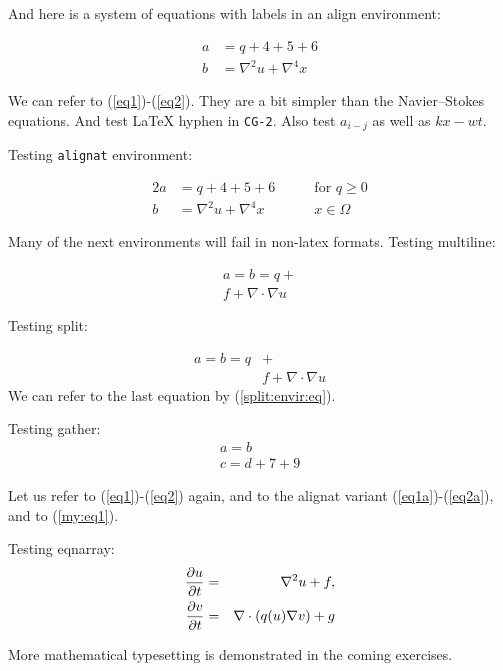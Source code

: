 \documentclass[%
oneside,                 %
final,                   %
10pt]{article}
\theoremstyle{definition}
\begin{document}
\begin{enumerate}
And here is a system of equations with labels in an align environment:

\begin{align}
a &= q + 4 + 5+ 6 \label{eq1} \\ 
b &= \nabla^2 u + \nabla^4 x \label{eq2}
\end{align}

We can refer to (\ref{eq1})-(\ref{eq2}). They are a bit simpler than
the Navier--Stokes equations. And test {\LaTeX} hyphen in \texttt{CG-2}.
Also test $a_{i-j}$ as well as $kx-wt$.

Testing \texttt{alignat} environment:

\begin{alignat}{2}
a &= q + 4 + 5+ 6\qquad & \mbox{for } q\geq 0 \label{eq1a} \\ 
b &= \nabla^2 u + \nabla^4 x & x\in\Omega \label{eq2a}
\end{alignat}

Many of the next environments will fail in non-latex formats.
Testing multiline:

\begin{multline}
a = b = q + \\ 
  f + \nabla\cdot\nabla u
\label{multiline:eq1}
\end{multline}

Testing split:

\begin{equation}
\label{split:envir:eq}
\begin{split}
a = b = q &+ \\ 
  & f + \nabla\cdot\nabla u
\end{split}
\end{equation}
We can refer to the last equation by (\ref{split:envir:eq}).

Testing gather:
\begin{gather}
a = b \\ 
c = d + 7 + 9
\end{gather}

Let us refer to (\ref{eq1})-(\ref{eq2}) again, and to the
alignat variant (\ref{eq1a})-(\ref{eq2a}), and to (\ref{my:eq1}).

Testing eqnarray:
\begin{eqnarray}
{\partial u\over\partial t} &=& \nabla^2 u + f, \label{myeq1}\\ 
{\partial v\over\partial t} &=& \nabla\cdot(q(u)\nabla v) + g \label{myeq2}
\end{eqnarray}

More mathematical typesetting is demonstrated in the coming exercises.


\end{enumerate}
\end{document}
